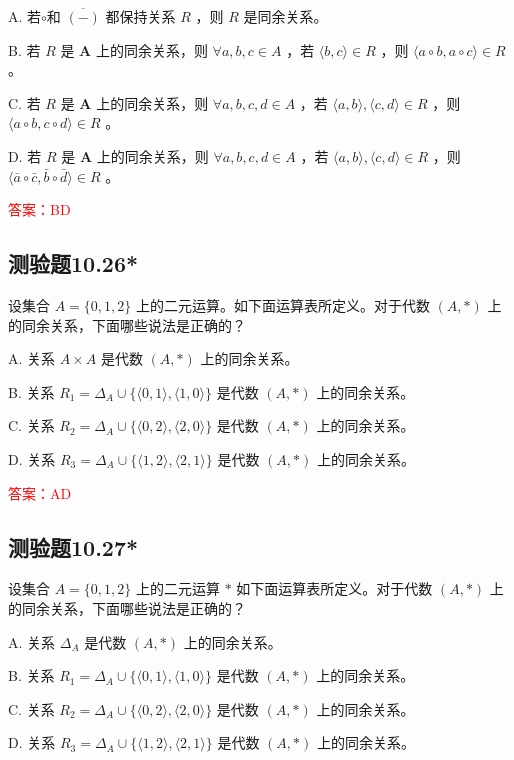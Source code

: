 \documentclass[UTF8, heading=true]{ctexart}
\begin{document}
A. 若$\circ$和 $\overline{(-)}$ 都保持关系 $R$ ，则 $R$ 是同余关系。

B. 若 $R$ 是 $\mathbf{A}$ 上的同余关系，则 $\forall a, b, c \in A$ ，若 $\langle b, c\rangle \in R$ ，则 $\langle a \circ b, a \circ c\rangle \in R$ 。

C. 若 $R$ 是 $\mathbf{A}$ 上的同余关系，则 $\forall a, b, c, d \in A$ ，若 $\langle a, b\rangle,\langle c, d\rangle \in R$ ，则 $\langle a \circ b, c \circ d\rangle \in R$ 。

D. 若 $R$ 是 $\mathbf{A}$ 上的同余关系，则 $\forall a, b, c, d \in A$ ，若 $\langle a, b\rangle,\langle c, d\rangle \in R$ ，则 $\langle\bar{a} \circ \bar{c}, \bar{b} \circ \bar{d}\rangle \in R$ 。


\textcolor{red}{答案：BD}

\subsection{测验题10.26*}

设集合 $A=\{0,1,2\}$ 上的二元运算。如下面运算表所定义。对于代数 $(A, *)$ 上的同余关系，下面哪些说法是正确的？

A. 关系 $A \times A$ 是代数 $(A, *)$ 上的同余关系。

B. 关系 $R_1=\Delta_A \cup\{\langle 0,1\rangle,\langle 1,0\rangle\}$ 是代数 $(A, *)$ 上的同余关系。

C. 关系 $R_2=\Delta_A \cup\{\langle 0,2\rangle,\langle 2,0\rangle\}$ 是代数 $(A, *)$ 上的同余关系。

D. 关系 $R_3=\Delta_A \cup\{\langle 1,2\rangle,\langle 2,1\rangle\}$ 是代数 $(A, *)$ 上的同余关系。

\textcolor{red}{答案：AD}

\subsection{测验题10.27*}

设集合 $A=\{0,1,2\}$ 上的二元运算 $*$ 如下面运算表所定义。对于代数 $(A, *)$ 上的同余关系，下面哪些说法是正确的？

A. 关系 $\Delta_A$ 是代数 $(A, *)$ 上的同余关系。

B. 关系 $R_1=\Delta_A \cup\{\langle 0,1\rangle,\langle 1,0\rangle\}$ 是代数 $(A, *)$ 上的同余关系。

C. 关系 $R_2=\Delta_A \cup\{\langle 0,2\rangle,\langle 2,0\rangle\}$ 是代数 $(A, *)$ 上的同余关系。

D. 关系 $R_3=\Delta_A \cup\{\langle 1,2\rangle,\langle 2,1\rangle\}$ 是代数 $(A, *)$ 上的同余关系。
\end{document}

